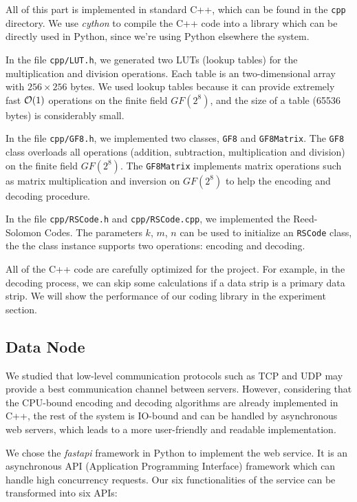 \documentclass[conference]{IEEEtran}
\begin{document}
All of this part is implemented in standard C++, which can be found in the \texttt{cpp} directory. We use \textit{cython}\cite{Robert2020Cython} to compile the C++ code into a library which can be directly used in Python, since we're using Python elsewhere the system.  

In the file \texttt{cpp/LUT.h}, we generated two LUTs (lookup tables) for the multiplication and division operations. Each table is an two-dimensional array with $256\times 256$ bytes. We used lookup tables because it can provide extremely fast $\order{1}$ operations on the finite field $GF(2^8)$, and the size of a table (65536 bytes) is considerably small.  

In the file \texttt{cpp/GF8.h}, we implemented two classes, \texttt{GF8} and \texttt{GF8Matrix}. The \texttt{GF8} class overloads all operations (addition, subtraction, multiplication and division) on the finite field $GF(2^8)$. The \texttt{GF8Matrix} implements matrix operations such as matrix multiplication and inversion on $GF(2^8)$ to help the encoding and decoding procedure. 

In the file \texttt{cpp/RSCode.h} and \texttt{cpp/RSCode.cpp}, we implemented the Reed-Solomon Codes. The parameters $k$, $m$, $n$ can be used to initialize an \texttt{RSCode} class, the the class instance supports two operations: encoding and decoding. 

All of the C++ code are carefully optimized for the project. For example, in the decoding process, we can skip some calculations if a data strip is a primary data strip. We will show the performance of our coding library in the experiment section.

\subsection{Data Node}

We studied that low-level communication protocols such as TCP and UDP may provide a best communication channel between servers. However, considering that the CPU-bound encoding and decoding algorithms are already implemented in C++, the rest of the system is IO-bound and can be handled by asynchronous web servers, which leads to a more user-friendly and readable implementation. 

We chose the \textit{fastapi}\cite{Sebastian2020fastapi} framework in Python to implement the web service. It is an asynchronous API (Application Programming Interface) framework which can handle high concurrency requests. Our six functionalities of the service can be transformed into six APIs:
\end{document}
